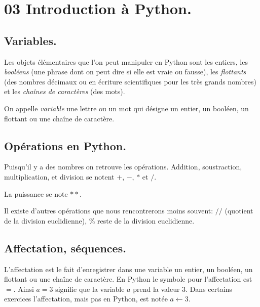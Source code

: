 \documentclass[a5paper]{article} %
\theoremstyle{plain}
\newenvironment{lecon}{\color{black}}{}
\begin{document}
\section{03 Introduction à Python.}

\subsection{Variables.}

\begin{lecon}
	
	Les objets élémentaires que l'on peut manipuler en Python sont les entiers, les \emph{\color{purple}booléens} (une phrase dont on peut dire si elle est vraie ou fausse), les \emph{\color{purple}flottants} (des nombres décimaux ou en écriture scientifiques pour les très grands nombres) et  les \emph{\color{purple}chaînes de caractères} (des mots).
	
	On appelle \emph{\color{purple}variable} une lettre ou un mot qui désigne un entier, un booléen, un flottant ou une chaîne de caractère.
	
\end{lecon}

\subsection{Opérations en Python.}

\begin{lecon}
	
	Puisqu'il y a des nombres on retrouve les opérations. Addition, soustraction, multiplication, et division se notent $+$, $-$, $*$ et $/$.
	
	La puissance se note $**$.
	
	Il existe d'autres opérations que nous rencontrerons moins souvent: $//$ (quotient de la division euclidienne), $\%$ reste de la division euclidienne.
	
\end{lecon}

\subsection{Affectation, séquences.}

\begin{lecon}
	
	L'affectation est le fait d'enregistrer dans une variable un entier, un booléen, un flottant ou une chaîne de caractère. En Python le symbole pour l'affectation est $=$. Ainsi $a=3$ signifie que la variable $a$ prend la valeur $3$. Dans certains exercices l'affectation, mais pas en Python, est notée $a \leftarrow 3$.
	
\end{lecon}
\end{document}
